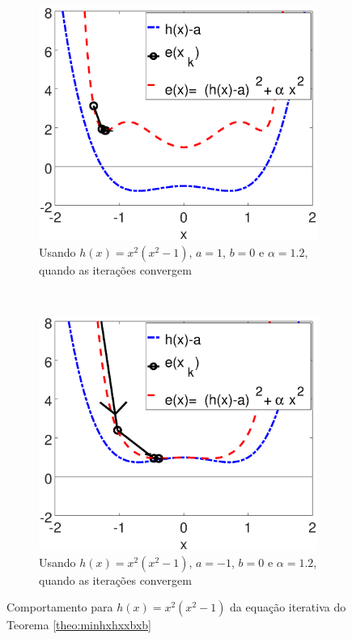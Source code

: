 \begin{figure}[!h]
    \centering
    \begin{subfigure}[b]{0.49\textwidth}
        \includegraphics[width=\textwidth]{chapters/minimization-hx/mfiles/hx_a_alphax/minimizando_hx_a_alphax_1.eps}
        \caption{Usando $h(x)=x^2(x^2-1)$, $a=1$, $b=0$ e $\alpha=1.2$, quando as iterações convergem}
        \label{fig:hxbcasesa}
    \end{subfigure}
    ~ %
    \begin{subfigure}[b]{0.49\textwidth}
        \includegraphics[width=\textwidth]{chapters/minimization-hx/mfiles/hx_a_alphax/minimizando_hx_a_alphax_2.eps}
        \caption{Usando $h(x)=x^2(x^2-1)$, $a=-1$, $b=0$ e $\alpha=1.2$, quando as iterações convergem}
        \label{fig:hxbcasesb}
    \end{subfigure}
    \caption{Comportamento para $h(x)=x^2(x^2-1)$ da equação iterativa do Teorema \ref{theo:minhxhxxbxb}}
    \label{fig:hxbcases}
\end{figure}



